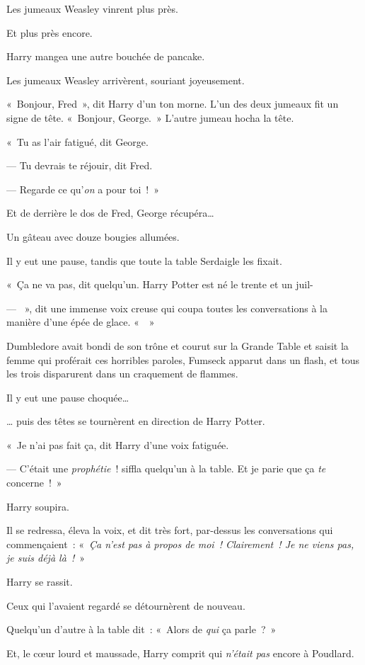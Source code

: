 Les jumeaux Weasley vinrent plus près.

Et plus près encore.

Harry mangea une autre bouchée de pancake.

Les jumeaux Weasley arrivèrent, souriant joyeusement.

«~Bonjour, Fred~», dit Harry d'un ton morne.
L'un des deux jumeaux fit un signe de tête.
«~Bonjour, George.~»
L'autre jumeau hocha la tête.

«~Tu as l'air fatigué, dit George.

--- Tu devrais te réjouir, dit Fred.

--- Regarde ce qu'\emph{on} a pour toi~!~»

Et de derrière le dos de Fred, George récupéra…

Un gâteau avec douze bougies allumées.

Il y eut une pause, tandis que toute la table Serdaigle les fixait.

«~Ça ne va pas, dit quelqu'un.
Harry Potter est né le trente et un juil-

--- ~», dit une immense voix creuse qui coupa toutes les conversations à la manière d'une épée de glace.
«~~»

Dumbledore avait bondi de son trône et courut sur la Grande Table et saisit la femme qui proférait ces horribles paroles, Fumseck apparut dans un flash, et tous les trois disparurent dans un craquement de flammes.

Il y eut une pause choquée…

… puis des têtes se tournèrent en direction de Harry Potter.

«~Je n'ai pas fait ça, dit Harry d'une voix fatiguée.

--- C'était une \emph{prophétie}~! siffla quelqu'un à la table.
Et je parie que ça \emph{te} concerne~!~»

Harry soupira.

Il se redressa, éleva la voix, et dit très fort, par-dessus les conversations qui commençaient~: «~\emph{Ça n'est pas à propos de moi~!
Clairement~!
Je ne viens pas, je suis déjà là~!}~»

Harry se rassit.

Ceux qui l'avaient regardé se détournèrent de nouveau.

Quelqu'un d'autre à la table dit~: «~Alors de \emph{qui} ça parle~?~»

Et, le cœur lourd et maussade, Harry comprit qui \emph{n'était pas} encore à Poudlard.


